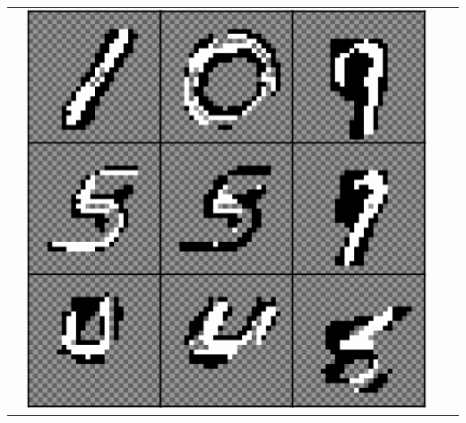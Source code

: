 \documentclass[xcolor={usenames,dvipsnames,svgnames}, compress]{beamer}
\begin{document}
\begin{frame}
\begin{table}
\begin{tabular}{cccc}
&\includegraphics[width=0.2\columnwidth]
    {figures/bmnist-mpe-iii}\\
    \end{tabular}
  \end{table}
\end{frame}
\end{document}
